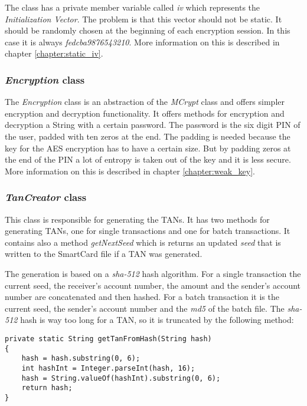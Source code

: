 The class has a private member variable called \textit{iv} which represents the \textit{Initialization Vector}. The problem is that this vector should not be static. It should be randomly chosen at the beginning of each encryption session. In this case it is always \textit{fedcba9876543210}. More information on this is described in chapter \ref{chapter:static_iv}.

\subsubsection{\textit{Encryption} class}

The \textit{Encryption} class is an abstraction of the \textit{MCrypt} class and offers simpler encryption and decryption functionality. It offers methods for encryption and decryption a String with a certain password. The password is the six digit PIN of the user, padded with ten zeros at the end. The padding is needed because the key for the AES encryption has to have a certain size. But by padding zeros at the end of the PIN a lot of entropy is taken out of the key and it is less secure. More information on this is described in chapter \ref{chapter:weak_key}.

\subsubsection{\textit{TanCreator} class}

This class is responsible for generating the TANs. It has two methods for generating TANs, one for single transactions and one for batch transactions. It contains also a method \textit{getNextSeed} which is returns an updated \textit{seed} that is written to the SmartCard file if a TAN was generated.

The generation is based on a \textit{sha-512} hash algorithm. For a single transaction the current seed,  the receiver's account number, the amount and the sender's account number are concatenated and then hashed. For a batch transaction it is the current seed, the sender's account number and the \textit{md5} of the batch file. The \textit{sha-512} hash is way too long for a TAN, so it is truncated by the following method:

\begin{lstlisting}[caption=getTanFromHash method]
private static String getTanFromHash(String hash)
{
	hash = hash.substring(0, 6);
	int hashInt = Integer.parseInt(hash, 16);
	hash = String.valueOf(hashInt).substring(0, 6);
	return hash;
}
\end{lstlisting}

